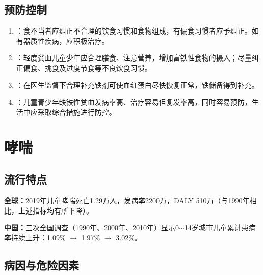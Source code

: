 \subsection{预防控制}

\begin{keybox}
\begin{enumerate}[leftmargin=*]
    \item {}：食不当者应纠正不合理的饮食习惯和食物组成，有偏食习惯者应予纠正。如有器质性疾病，应积极治疗。
    \item {}：轻度贫血儿童少年应合理膳食、注意营养，增加富铁性食物的摄入；尽量纠正偏食、挑食及过度节食等不良饮食习惯。
    \item {}：在医生监督下合理补充铁剂可使血红蛋白尽快恢复正常，铁储备得到补充。
    \item {}：儿童青少年缺铁性贫血发病率高、治疗容易但复发率高，同时容易预防，生活中应采取综合措施进行防控。
\end{enumerate}
\end{keybox}

\section{哮喘}

\subsection{流行特点}

\begin{keybox}
\textbf{全球：}2019年儿童哮喘死亡1.29万人，发病率2200万，DALY 510万（与1990年相比，上述指标均有所下降）。

\textbf{中国：}三次全国调查（1990年、2000年、2010年）显示0$\sim$14岁城市儿童累计患病率持续上升：1.09\% $\rightarrow$ 1.97\% $\rightarrow$ 3.02\%。
\end{keybox}

\subsection{病因与危险因素}

